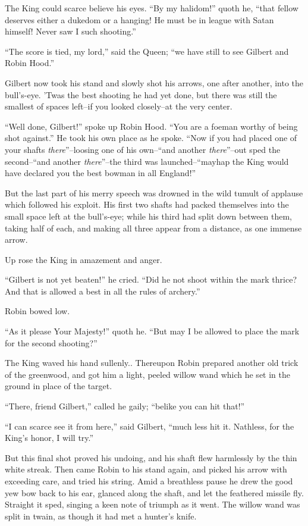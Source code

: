 The King could scarce believe his eyes. ``By my halidom!'' quoth he,
``that fellow deserves either a dukedom or a hanging! He must be in
league with Satan himself! Never saw I such shooting.''

``The score is tied, my lord,'' said the Queen; ``we have still to see
Gilbert and Robin Hood.''

Gilbert now took his stand and slowly shot his arrows, one after
another, into the bull's-eye. 'Twas the best shooting he had yet done,
but there was still the smallest of spaces left--if you looked
closely--at the very center.

``Well done, Gilbert!'' spoke up Robin Hood. ``You are a foeman worthy
of being shot against.'' He took his own place as he spoke. ``Now if you
had placed one of your shafts \emph{there}''--loosing one of his
own--``and another \emph{there}''--out sped the second--``and another
\emph{there}''--the third was launched--``mayhap the King would have
declared you the best bowman in all England!''

But the last part of his merry speech was drowned in the wild tumult of
applause which followed his exploit. His first two shafts had packed
themselves into the small space left at the bull's-eye; while his third
had split down between them, taking half of each, and making all three
appear from a distance, as one immense arrow.

Up rose the King in amazement and anger.

``Gilbert is not yet beaten!'' he cried. ``Did he not shoot within the
mark thrice? And that is allowed a best in all the rules of archery.''

Robin bowed low.

``As it please Your Majesty!'' quoth he. ``But may I be allowed to place
the mark for the second shooting?''

The King waved his hand sullenly.. Thereupon Robin prepared another old
trick of the greenwood, and got him a light, peeled willow wand which he
set in the ground in place of the target.

``There, friend Gilbert,'' called he gaily; ``belike you can hit that!''

``I can scarce see it from here,'' said Gilbert, ``much less hit it.
Nathless, for the King's honor, I will try.''

But this final shot proved his undoing, and his shaft flew harmlessly by
the thin white streak. Then came Robin to his stand again, and picked
his arrow with exceeding care, and tried his string. Amid a breathless
pause he drew the good yew bow back to his ear, glanced along the shaft,
and let the feathered missile fly. Straight it sped, singing a keen note
of triumph as it went. The willow wand was split in twain, as though it
had met a hunter's knife.

